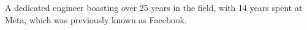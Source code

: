 

\begin{cvparagraph}

    A dedicated engineer boasting over 25 years in the field, with 14 years spent at Meta, which was previously known as Facebook.

\end{cvparagraph}
